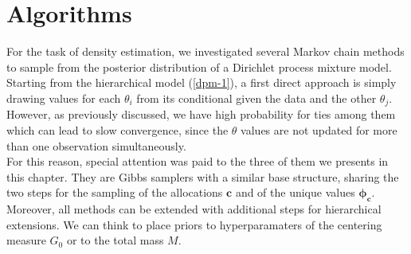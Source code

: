 \section{Algorithms}
For the task of density estimation, we investigated several Markov chain methods to sample from the posterior distribution of a Dirichlet process mixture model. \\
Starting from the hierarchical model (\ref{dpm-1}), a first direct approach is simply drawing values for each $\theta_i$ from its conditional given the data and the other $\theta_j$.
However, as previously discussed, we have high probability for ties among them which can lead to slow convergence, since the $\theta$ values are not updated for more than one observation simultaneously. \\
For this reason, special attention was paid to the three of them we presents in this chapter.
They are Gibbs samplers with a similar base structure, sharing the two steps for the sampling of the allocations $\mathbf{c}$ and of the unique values $\mathbf{\phi_c}$. \\
Moreover, all methods can be extended with additional steps for hierarchical extensions.
We can think to place priors to hyperparamaters of the centering measure $G_0$ or to the total mass $M$.

